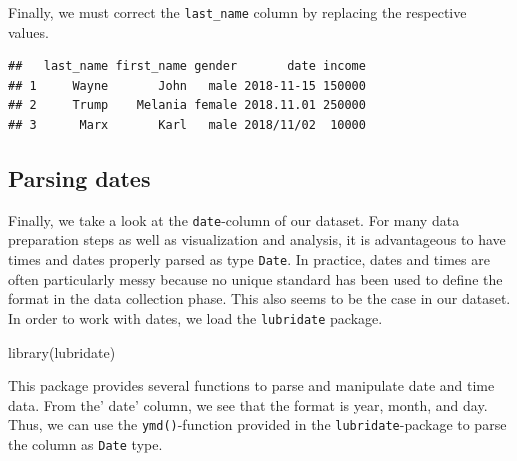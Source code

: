 \documentclass[
  12pt,
]{style/krantz}
\newenvironment{Shaded}{\begin{snugshade}}{\end{snugshade}}
\newcommand{\DecValTok}[1]{\textcolor[rgb]{0.00,0.00,0.81}{#1}}
\newcommand{\FunctionTok}[1]{\textcolor[rgb]{0.00,0.00,0.00}{#1}}
\newcommand{\NormalTok}[1]{#1}
\newcommand{\OtherTok}[1]{\textcolor[rgb]{0.56,0.35,0.01}{#1}}
\newcommand{\SpecialCharTok}[1]{\textcolor[rgb]{0.00,0.00,0.00}{#1}}
\begin{document}
Finally, we must correct the \texttt{last\_name} column by replacing the respective values.

\begin{Shaded}
\end{Shaded}

\begin{verbatim}
##   last_name first_name gender       date income
## 1     Wayne       John   male 2018-11-15 150000
## 2     Trump    Melania female 2018.11.01 250000
## 3      Marx       Karl   male 2018/11/02  10000
\end{verbatim}

\hypertarget{parsing-dates}{%
\subsection{Parsing dates}\label{parsing-dates}}

Finally, we take a look at the \texttt{date}-column of our dataset. For many data preparation steps as well as visualization and analysis, it is advantageous to have times and dates properly parsed as type \texttt{Date}. In practice, dates and times are often particularly messy because no unique standard has been used to define the format in the data collection phase. This also seems to be the case in our dataset. In order to work with dates, we load the \texttt{lubridate} package.

\begin{Shaded}
\begin{Highlighting}[]
\FunctionTok{library}\NormalTok{(lubridate)}
\end{Highlighting}
\end{Shaded}

This package provides several functions to parse and manipulate date and time data. From the' date' column, we see that the format is year, month, and day. Thus, we can use the \texttt{ymd()}-function provided in the \texttt{lubridate}-package to parse the column as \texttt{Date} type.

\begin{Shaded}
\end{Shaded}
\end{document}
